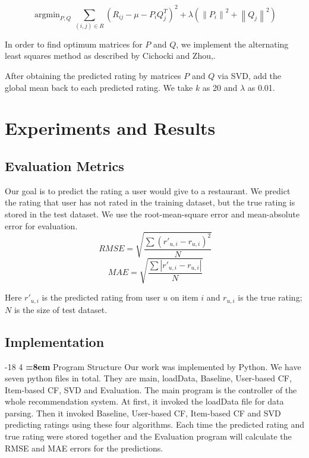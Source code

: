 \documentclass{llncs}
\makeatletter
\DeclareMathOperator*{\argmin}{argmin}
\renewcommand\subsubsection{\@startsection{subsubsection}{3}{\z@}%
	{-18\p@ \@plus -4\p@ \@minus -4\p@}%
	{4\p@ \@plus 2\p@ \@minus 2\p@}%
	{\normalfont\normalsize\bfseries\boldmath
		\rightskip=\z@ \@plus 8em\pretolerance=10000 }}
\makeatother
\begin{document}
\begin{equation}
\argmin_{P,Q}\sum_{(i,j)\in{R}}{(R_{ij} - \mu - P_iQ_{j}^{T})}^2 + \lambda({\left\|P_i\right\|}^2 + {\left\|Q_j\right\|}^2 )
\end{equation}

In order to find optimum matrices for $P$ and $Q$, we implement the alternating least squares method as described by Cichocki and Zhou\cite{Andrzej},\cite{Yunhong}.

After obtaining the predicted rating by matrices $P$ and $Q$ via SVD, add the global mean back to each predicted rating. We take $k$ as 20 and $\lambda$ as 0.01.

\section{Experiments and Results}
%
\subsection{Evaluation Metrics}
Our goal is to predict the rating a user would give to a restaurant. We predict the rating that user has not rated in the training dataset, but the true rating is stored in the test dataset. We use the root-mean-square error and mean-absolute error for evaluation.
\begin{equation}
\ RMSE = \sqrt{\frac{\sum{\left(r'_{u,i} - r_{u,i}\right)}^2}{N}}
\end{equation}
\begin{equation}
\ MAE = \sqrt{\frac{\sum{\left|r'_{u,i} - r_{u,i}\right|}}{N}}
\end{equation}

Here $r'_{u,i}$ is the predicted rating from user $u$ on item $i$ and $r_{u,i}$ is the true rating; $N$ is the size of test dataset. 
\subsection{Implementation}
\subsubsection{Program Structure}
Our work was implemented by Python. We have seven python files in total. They are main, loadData, Baseline, User-based CF, Item-based CF, SVD and Evaluation. The main program is the controller of the whole recommendation system. At first, it invoked the loadData file for data parsing. Then it invoked Baseline, User-based CF, Item-based CF and SVD predicting ratings using these four algorithms. Each time the predicted rating and true rating were stored together and the Evaluation program will calculate the RMSE and MAE errors for the predictions. 
\end{document}
